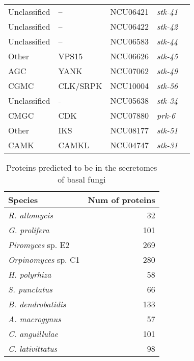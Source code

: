 \begin{table}[htbp]
\begin{tabular}{lllll}
  Unclassified & -- & NCU06421 & \emph{stk-41} \\ 
  Unclassified & -- & NCU06422 & \emph{stk-42} \\ 
  Unclassified & -- & NCU06583 & \emph{stk-44} \\ 
  Other & VPS15 & NCU06626 & \emph{stk-45} \\ 
  AGC & YANK & NCU07062 & \emph{stk-49} \\ 
  CGMC & CLK/SRPK & NCU10004 & \emph{stk-56} \\ 
  Unclassified & - & NCU05638 & \emph{stk-34} \\ 
  CMGC & CDK & NCU07880 & \emph{prk-6} \\ 
  Other & IKS & NCU08177 & \emph{stk-51} \\ 
  CAMK & CAMKL & NCU04747 & \emph{stk-31} \\ 
   \hline
\end{tabular}
\end{table}
\begin{table}[htbp]
\centering
\caption[Chytrid secretome predictions]{Proteins predicted to be in the secretomes of basal fungi} 
\label{tab:ChInhib_ChySec}
\begin{tabular}{lr}
  \hline
Species & Num of proteins \\ 
  \hline
\emph{R. allomycis} &  32 \\ 
  \emph{G. prolifera} & 101 \\ 
  \emph{Piromyces} sp. E2 & 269 \\ 
  \emph{Orpinomyces} sp. C1 & 280 \\ 
  \emph{H. polyrhiza} &  58 \\ 
  \emph{S. punctatus} &  66 \\ 
  \emph{B. dendrobatidis} & 133 \\ 
  \emph{A. macrogynus} &  57 \\ 
  \emph{C. anguillulae} & 101 \\ 
  \emph{C. lativittatus} &  98 \\ 
   \hline
\end{tabular}
\end{table}
